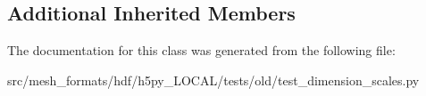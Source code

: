\subsection*{Additional Inherited Members}


The documentation for this class was generated from the following file\+:\begin{DoxyCompactItemize}
\item 
src/mesh\+\_\+formats/hdf/h5py\+\_\+\+L\+O\+C\+A\+L/tests/old/test\+\_\+dimension\+\_\+scales.\+py\end{DoxyCompactItemize}
